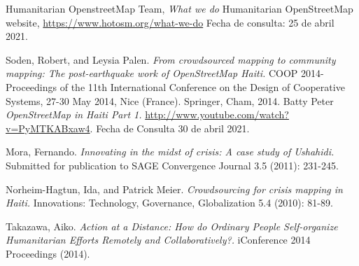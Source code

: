 \begin{thebibliography}{1}
   Humanitarian OpenstreetMap Team, {\em What we do} Humanitarian OpenStreetMap website, \url{https://www.hotosm.org/what-we-do} Fecha de consulta: 25 de abril 2021.

   Soden, Robert, and Leysia Palen. {\em From crowdsourced mapping to community mapping: The post-earthquake work of OpenStreetMap Haiti.} COOP 2014-Proceedings of the 11th International Conference on the Design of Cooperative Systems, 27-30 May 2014, Nice (France). Springer, Cham, 2014.
   Batty Peter  {\em OpenStreetMap in Haiti Part 1.} \url{http://www.youtube.com/watch?v=PyMTKABxaw4}. Fecha de Consulta 30 de abril 2021.

   Mora, Fernando. {\em Innovating in the midst of crisis: A case study of Ushahidi.} Submitted for publication to SAGE Convergence Journal 3.5 (2011): 231-245.

   Norheim-Hagtun, Ida, and Patrick Meier. {\em Crowdsourcing for crisis mapping in Haiti.} Innovations: Technology, Governance, Globalization 5.4 (2010): 81-89.

   Takazawa, Aiko. {\em Action at a Distance: How do Ordinary People Self-organize Humanitarian Efforts Remotely and Collaboratively?.} iConference 2014 Proceedings (2014).
\end{thebibliography}
